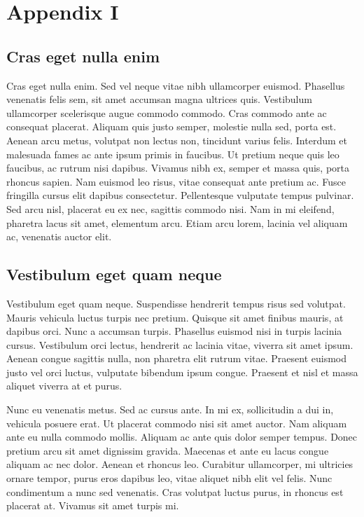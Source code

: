 
\chapter{Appendix I}

\section{Cras eget nulla enim}
Cras eget nulla enim. Sed vel neque vitae nibh ullamcorper euismod. Phasellus venenatis felis sem, sit amet accumsan magna ultrices quis. Vestibulum ullamcorper scelerisque augue commodo commodo. Cras commodo ante ac consequat placerat. Aliquam quis justo semper, molestie nulla sed, porta est. Aenean arcu metus, volutpat non lectus non, tincidunt varius felis. Interdum et malesuada fames ac ante ipsum primis in faucibus. Ut pretium neque quis leo faucibus, ac rutrum nisi dapibus. Vivamus nibh ex, semper et massa quis, porta rhoncus sapien. Nam euismod leo risus, vitae consequat ante pretium ac. Fusce fringilla cursus elit dapibus consectetur. Pellentesque vulputate tempus pulvinar. Sed arcu nisl, placerat eu ex nec, sagittis commodo nisi. Nam in mi eleifend, pharetra lacus sit amet, elementum arcu. Etiam arcu lorem, lacinia vel aliquam ac, venenatis auctor elit.

\section{Vestibulum eget quam neque}
Vestibulum eget quam neque. Suspendisse hendrerit tempus risus sed volutpat. Mauris vehicula luctus turpis nec pretium. Quisque sit amet finibus mauris, at dapibus orci. Nunc a accumsan turpis. Phasellus euismod nisi in turpis lacinia cursus. Vestibulum orci lectus, hendrerit ac lacinia vitae, viverra sit amet ipsum. Aenean congue sagittis nulla, non pharetra elit rutrum vitae. Praesent euismod justo vel orci luctus, vulputate bibendum ipsum congue. Praesent et nisl et massa aliquet viverra at et purus.

Nunc eu venenatis metus. Sed ac cursus ante. In mi ex, sollicitudin a dui in, vehicula posuere erat. Ut placerat commodo nisi sit amet auctor. Nam aliquam ante eu nulla commodo mollis. Aliquam ac ante quis dolor semper tempus. Donec pretium arcu sit amet dignissim gravida. Maecenas et ante eu lacus congue aliquam ac nec dolor. Aenean et rhoncus leo. Curabitur ullamcorper, mi ultricies ornare tempor, purus eros dapibus leo, vitae aliquet nibh elit vel felis. Nunc condimentum a nunc sed venenatis. Cras volutpat luctus purus, in rhoncus est placerat at. Vivamus sit amet turpis mi.